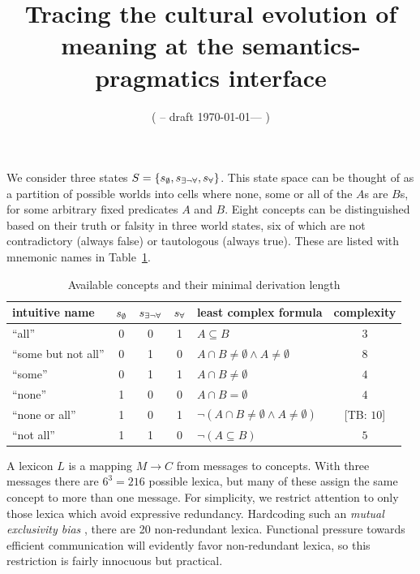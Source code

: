 \documentclass[a4paper]{article}
\title{Tracing the cultural evolution of meaning at the semantics-pragmatics interface}
\author{%
    ( -- draft \today --- )
}
\date{}
\newcommand{\tb}[1]{\textcolor[rgb]{.8,.33,.0}{[TB: #1]}}%
\newcommand{\set}[1]{\left\{#1\right\}}
\newcommand{\States}{\ensuremath{S}\xspace}		%
\newcommand{\state}{\ensuremath{s}\xspace}		%
\newcommand{\mystate}[1]{\ensuremath{\state_{\text{#1}}}\xspace} %
\newcommand{\Messgs}{\ensuremath{M}\xspace}		%
\newcommand{\ssome}{\mystate{\ensuremath{\exists\neg\forall}}}
\newcommand{\sall}{\mystate{\ensuremath{\forall}}}
\newcommand{\snone}{\mystate{\ensuremath{\emptyset}}}
\begin{document}
We consider three states $\States = \set{\snone, \ssome, \sall}$. This state space can be
thought of as a partition of possible worlds into cells where none, some or all of the $A$s are
$B$s, for some arbitrary fixed predicates $A$ and $B$. Eight concepts can be distinguished
based on their truth or falsity in three world states, six of which are not contradictory
(always false) or tautologous (always true). These are listed with mnemonic names in
Table~\ref{tab:concepts}. 

\begin{table}
  \centering
\begin{center}
  \begin{tabular}{lccclc}
    \toprule
    intuitive name
    & \snone
    & \ssome
    & \sall
    & least complex formula
    & complexity
    \\ \midrule
    ``all''
    & 0
    & 0
    & 1
    & $A \subseteq B$
    & $3$
    \\
    ``some but not all''
    & 0
    & 1
    & 0
    & $A \cap B \neq \emptyset \wedge A \neq \emptyset$
    & $8$
    \\    
    ``some''
    & 0
    & 1
    & 1
    & $A \cap B \neq \emptyset$
    & $4$
    \\
    ``none''
    & 1
    & 0
    & 0
    & $A \cap B = \emptyset$
    & $4$
    \\
    ``none or all''
    & 1
    & 0
    & 1
    & $\neg(A \cap B \neq \emptyset \wedge A \neq \emptyset)$
    & \tb{$10$}
    \\
    ``not all''
    & 1
    & 1
    & 0
    & $\neg (A \subseteq B)$
    & $5$
    \\
    \bottomrule
  \end{tabular}
\end{center}
\caption{Available concepts and their minimal derivation length}
\label{tab:concepts}
\end{table}

A lexicon $L$ is a mapping $\Messgs \rightarrow C$ from messages to concepts. With three
messages there are $6^3 = 216$ possible lexica, but many of these assign the same concept to
more than one message. For simplicity, we restrict attention to only those lexica which avoid
expressive redundancy. Hardcoding such an \emph{mutual exclusivity bias}
\citep[e.g.][]{Clark2009:Lexical-Meaning}, there are 20 non-redundant lexica. Functional
pressure towards efficient communication will evidently favor non-redundant lexica, so this
restriction is fairly innocuous but practical.
\end{document}
